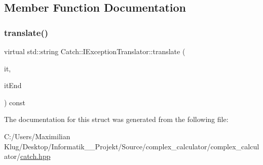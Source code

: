 \subsection{Member Function Documentation}
\mbox{\label{struct_catch_1_1_i_exception_translator_a2a554b96ed5ed411e7c796b6b42837a5}} 
\subsubsection{\texorpdfstring{translate()}{translate()}}
{\footnotesize\ttfamily virtual std\+::string Catch\+::\+I\+Exception\+Translator\+::translate (\begin{DoxyParamCaption}\item[{Exception\+Translators\+::const\+\_\+iterator}]{it,  }\item[{Exception\+Translators\+::const\+\_\+iterator}]{it\+End }\end{DoxyParamCaption}) const\hspace{0.3cm}{\ttfamily [pure virtual]}}



The documentation for this struct was generated from the following file\+:\begin{DoxyCompactItemize}
\item 
C\+:/\+Users/\+Maximilian Klug/\+Desktop/\+Informatik\+\_\+\_\+\+Projekt/\+Source/complex\+\_\+calculator/complex\+\_\+calculator/\mbox{\hyperlink{catch_8hpp}{catch.\+hpp}}\end{DoxyCompactItemize}
